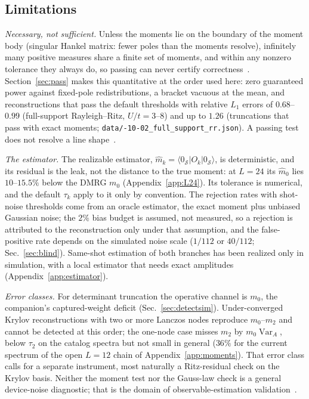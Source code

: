 \documentclass[submission, PhysCore]{SciPost}
\begin{document}
\subsection{Limitations}
\label{sec:limitlist}
\emph{Necessary, not sufficient.} Unless the moments lie on the boundary of the moment body (singular Hankel matrix: fewer poles than the moments resolve), infinitely many positive measures share a finite set of moments, and within any nonzero tolerance they always do, so passing can never certify correctness~\cite{ShohatTamarkin1943,Akhiezer1965}. Section~\ref{sec:pass} makes this quantitative at the order used here: zero guaranteed power against fixed-pole redistributions, a bracket vacuous at the mean, and reconstructions that pass the default thresholds with relative $L_1$ errors of $0.68$--$0.99$ (full-support Rayleigh--Ritz, $U/t=3$--$8$) and up to $1.26$ (truncations that pass with exact moments; \texttt{data/-10-02\_full\_support\_rr.json}). A passing test does not resolve a line shape~\cite{KPM2006,GM2010,Szego1975}.

\emph{The estimator.} The realizable estimator, $\widehat m_k=\langle 0_\mathcal S|O_k|0_\mathcal S\rangle$, is deterministic, and its residual is the leak, not the distance to the true moment: at $L=24$ its $\widehat m_0$ lies $10$--$15.5\%$ below the DMRG $m_0$ (Appendix~\ref{app:L24}). Its tolerance is numerical, and the default $\tau_k$ apply to it only by convention. The rejection rates with shot-noise thresholds come from an oracle estimator, the exact moment plus unbiased Gaussian noise; the $2\%$ bias budget is assumed, not measured, so a rejection is attributed to the reconstruction only under that assumption, and the false-positive rate depends on the simulated noise scale ($1/112$ or $40/112$; Sec.~\ref{sec:blind}). Same-shot estimation of both branches has been realized only in simulation, with a local estimator that needs exact amplitudes (Appendix~\ref{app:estimator}).

\emph{Error classes.} For determinant truncation the operative channel is $m_0$, the companion's captured-weight deficit (Sec.~\ref{sec:detectsim}). Under-converged Krylov reconstructions with two or more Lanczos nodes reproduce $m_0$--$m_2$ and cannot be detected at this order; the one-node case misses $m_2$ by $m_0\operatorname{Var}_A$, below $\tau_2$ on the catalog spectra but not small in general ($36\%$ for the current spectrum of the open $L=12$ chain of Appendix~\ref{app:moments}). That error class calls for a separate instrument, most naturally a Ritz-residual check on the Krylov basis. Neither the moment test nor the Gauss-law check is a general device-noise diagnostic; that is the domain of observable-estimation validation~\cite{OEACV2026}.
\end{document}
